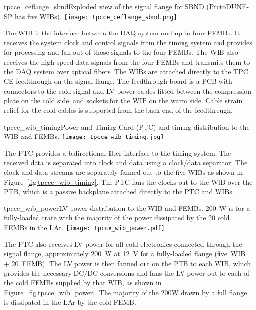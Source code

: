 \begin{cdrfigure}{tpcce_ceflange_sbnd}{Exploded view of 
the signal flange for SBND (ProtoDUNE-SP has five WIBs).}
\texttt{[image: tpcce\_ceflange\_sbnd.png]}
\end{cdrfigure}

The WIB is the interface between the
DAQ system and up to four
FEMBs. It receives the system clock and control signals from the
timing system and provides for processing and fan-out of those signals to the four
FEMBs. The WIB also receives the high-speed data signals from the four 
FEMBs and transmits them to the DAQ system over optical
fibers.  The WIBs are attached directly to the TPC
CE feedthrough on the signal flange. The feedthrough
board is a PCB with connectors to the cold signal and LV power cables fitted
between the compression plate on the cold side, and sockets for
the WIB on the warm side. Cable strain relief for the cold cables is 
supported from the back end of the feedthrough.



\begin{cdrfigure}{tpcce_wib_timing}{Power and Timing Card (PTC) 
and timing distribution to the WIB and FEMBs.}
\texttt{[image: tpcce\_wib\_timing.jpg]}
\end{cdrfigure}

The PTC provides a bidirectional fiber interface to the
timing system.  The received data is separated into clock and
data using a clock/data separator.  The clock and data
streams are separately fanned-out to the five WIBs as shown in
Figure~\ref{fig:tpcce_wib_timing}. The PTC fans the clocks out to the WIB over the
PTB, which is a passive backplane attached directly to the PTC and
WIBs.

\begin{cdrfigure}{tpcce_wib_power}{LV power distribution 
to the WIB and FEMBs. 200~W is for a fully-loaded crate 
with the majority of the power dissipated by the 20 cold FEMBs in the LAr.}
\texttt{[image: tpcce\_wib\_power.pdf]}
\end{cdrfigure}

The PTC also receives LV power for all cold
electronics connected through the signal flange, approximately 200~W at 12~V for a
fully-loaded flange (five~WIB + 20~FEMB). The LV power is then fanned out
on the PTB to each WIB, which provides the necessary DC/DC conversions and fans
the LV power out to each of the cold FEMBs supplied by that WIB, 
as shown in Figure~\ref{fig:tpcce_wib_power}. The 
majority of the 200W drawn by a full flange is dissipated in the LAr
by the cold FEMB.


